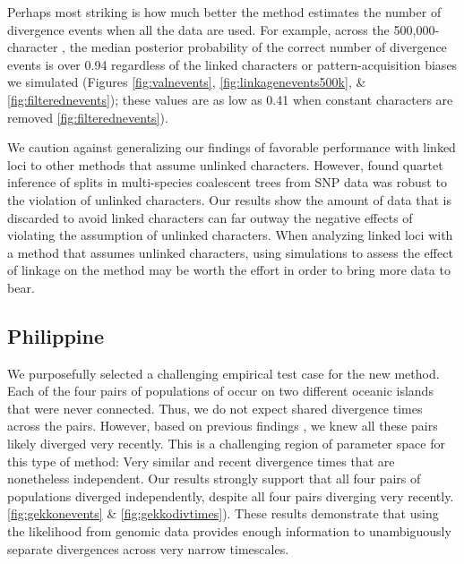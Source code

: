 Perhaps most striking is how much better the method estimates the number
of divergence events when all the data are used.
For example, across the 500,000-character \datasets, the
median posterior probability of the correct number of divergence events
is over 0.94 regardless of the linked characters
or pattern-acquisition biases we simulated
(Figures
\ref{fig:valnevents},
\ref{fig:linkagenevents500k},
\&
\ref{fig:filterednevents});
these values are as low as 0.41 when constant characters are removed
\ref{fig:filterednevents}).

We caution against generalizing our findings
of favorable performance with linked loci
to other methods that assume unlinked characters.
However, 
\citet{ChifmanKubatko2014}
found quartet inference of splits in multi-species coalescent trees
from SNP data was robust to the violation of unlinked characters.
Our results show the amount of data that is discarded to avoid linked
characters can far outway the negative effects of violating the assumption of
unlinked characters.
When analyzing linked loci with a method that assumes unlinked characters,
using simulations to assess the effect of linkage on the method may be worth
the effort in order to bring more data to bear.


\subsection{Philippine }
We purposefully selected a challenging empirical test case for the new method.
Each of the four pairs of populations of  occur on two different
oceanic islands that were never connected.
Thus, we do not expect shared divergence times across the pairs.
However, based on previous findings \citep{Siler2012, Siler2014kikuchii}, we
knew all these pairs likely diverged very recently.
This is a challenging region of parameter space for this type of method: Very
similar and recent divergence times that are nonetheless independent.
Our results strongly support that all four pairs of populations diverged
independently, despite all four pairs diverging very recently.
\ref{fig:gekkonevents}
\& 
\ref{fig:gekkodivtimes}).
These results demonstrate that using the likelihood from genomic data provides
enough information to unambiguously separate divergences across very narrow
timescales.

